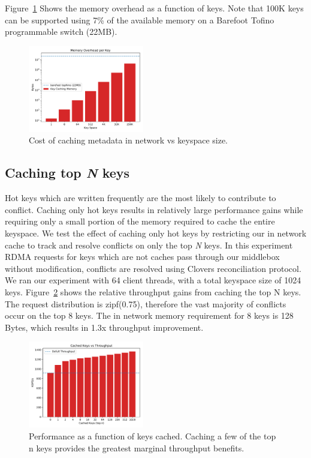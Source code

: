 Figure~\ref{fig:memory} Shows the memory overhead as a function of
keys. Note that 100K keys can be supported using 7\% of the available
memory on a Barefoot Tofino programmable switch (22MB).

\begin{figure}
    \includegraphics[width=0.45\textwidth]{fig/memory.pdf}
    \caption{Cost of caching metadata in network vs keyspace size.}
    \label{fig:memory}
\end{figure}

\subsection{Caching top \textit{N} keys} 
Hot keys which are written frequently are the most likely to
contribute to conflict. Caching only hot keys results in relatively
large performance gains while requiring only a small portion of the
memory required to cache the entire keyspace. We test the effect of
caching only hot keys by restricting our in network cache to track and
resolve conflicts on only the top \textit{N} keys. In this experiment
RDMA requests for keys which are not caches pass through our middlebox
without modification, conflicts are resolved using Clovers
reconciliation protocol. We ran our experiment with 64 client threads,
with a total keyspace size of 1024 keys. Figure~\ref{fig:cache} shows
the relative throughput gains from caching the top N keys. The request
distribution is zipf(0.75), therefore the vast majority of conflicts
occur on the top 8 keys. The in network memory requirement for 8 keys
is 128 Bytes, which results in 1.3x throughput improvement.

\begin{figure}
    \includegraphics[width=0.45\textwidth]{fig/cache.pdf}
    \caption{Performance as a function of keys cached. Caching a few
    of the top n keys provides the greatest marginal throughput
    benefits.}
    \label{fig:cache}
\end{figure}


